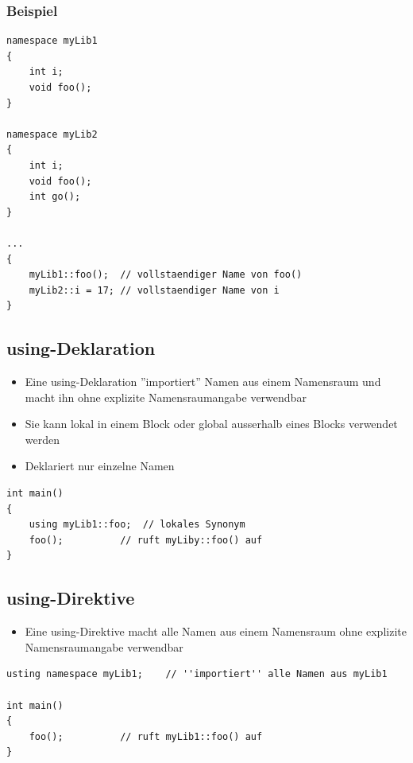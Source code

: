 \subsubsection{Beispiel}
\label{sec:Deklaration von Namespaces: Beispiel}
\noindent
\begin{minipage}{\linewidth}
\begin{lstlisting}
namespace myLib1
{
	int i;
	void foo();
}

namespace myLib2
{
	int i;
	void foo();
	int go();
}

...
{
	myLib1::foo();	// vollstaendiger Name von foo()
	myLib2::i = 17;	// vollstaendiger Name von i
}
\end{lstlisting}
\end{minipage}

\subsection{using-Deklaration}
\label{sec:using-Deklaration}
\begin{itemize}
	\item Eine using-Deklaration ''importiert'' Namen aus einem Namensraum und macht ihn ohne explizite Namensraumangabe verwendbar
	\item Sie kann lokal in einem Block oder global ausserhalb eines Blocks verwendet werden
	\item Deklariert nur einzelne Namen
\end{itemize}
\noindent
\begin{minipage}{\linewidth}
\begin{lstlisting}
int main()
{
	using myLib1::foo;	// lokales Synonym
	foo();			// ruft myLiby::foo() auf
}
\end{lstlisting}
\end{minipage}

\subsection{using-Direktive}
\label{sec:using-Direktive}
\begin{itemize}
	\item Eine using-Direktive macht alle Namen aus einem Namensraum ohne explizite Namensraumangabe verwendbar
\end{itemize}
\noindent
\begin{minipage}{\linewidth}
\begin{lstlisting}
usting namespace myLib1;	// ''importiert'' alle Namen aus myLib1

int main()
{
	foo();			// ruft myLib1::foo() auf
}
\end{lstlisting}
\end{minipage}

